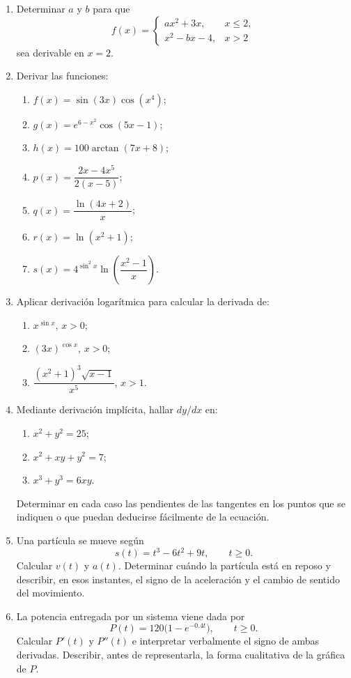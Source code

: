 \begin{enumerate}[label=\textbf{\arabic*.},leftmargin=*]
\item Determinar $a$ y $b$ para que
\[
f(x)=
\begin{cases}
ax^2+3x,&x\leq2,\\
x^2-bx-4,&x>2
\end{cases}
\]
sea derivable en $x=2$.

\item Derivar las funciones:
\begin{enumerate}[label=\alph*)]
\item $f(x)=\sin(3x)\cos(x^4)$;
\item $g(x)=e^{6-x^2}\cos(5x-1)$;
\item $h(x)=100\arctan(7x+8)$;
\item $p(x)=\dfrac{2x-4x^5}{2(x-5)}$;
\item $q(x)=\dfrac{\ln(4x+2)}{x}$;
\item $r(x)=\ln(x^2+1)$;
\item $s(x)=4^{\sin^2x}\ln\!\left(\dfrac{x^2-1}{x}\right)$.
\end{enumerate}

\item Aplicar derivación logarítmica para calcular la derivada de:
\begin{enumerate}[label=\alph*)]
\item $x^{\sin x}$, $x>0$;
\item $(3x)^{\cos x}$, $x>0$;
\item $\dfrac{(x^2+1)^3\sqrt{x-1}}{x^5}$, $x>1$.
\end{enumerate}

\item Mediante derivación implícita, hallar $dy/dx$ en:
\begin{enumerate}[label=\alph*)]
\item $x^2+y^2=25$;
\item $x^2+xy+y^2=7$;
\item $x^3+y^3=6xy$.
\end{enumerate}
Determinar en cada caso las pendientes de las tangentes en los puntos que se indiquen o que puedan deducirse fácilmente de la ecuación.

\item Una partícula se mueve según
\[
s(t)=t^3-6t^2+9t,
\qquad t\geq0.
\]
Calcular $v(t)$ y $a(t)$. Determinar cuándo la partícula está en reposo y describir, en esos instantes, el signo de la aceleración y el cambio de sentido del movimiento.

\item La potencia entregada por un sistema viene dada por
\[
P(t)=120\bigl(1-e^{-0.4t}\bigr),
\qquad t\geq0.
\]
Calcular $P'(t)$ y $P''(t)$ e interpretar verbalmente el signo de ambas derivadas. Describir, antes de representarla, la forma cualitativa de la gráfica de $P$.


\end{enumerate}
